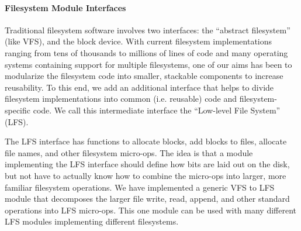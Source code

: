 \preparagraphspacing{}
\paragraph{Filesystem Module Interfaces}
\label{sec:interfaces}

Traditional filesystem software involves two interfaces: the ``abstract
filesystem'' (like VFS), and the block device. With current filesystem
implementations ranging from tens of thousands to millions of lines of code
and many operating systems containing support for multiple filesystems, one of
our aims has been to modularize the filesystem code into smaller, stackable
components to increase reusability. To this end, we add an additional
interface that helps to divide filesystem implementations into common (i.e.
reusable) code and filesystem-specific code. We call this intermediate
interface the ``Low-level File System'' (LFS).

The LFS interface has functions to allocate blocks, add blocks to files,
allocate file names, and other filesystem micro-ops. The idea is that a module
implementing the LFS interface should define how bits are laid out on the
disk, but not have to actually know how to combine the micro-ops into larger,
more familiar filesystem operations. We have implemented a generic VFS to LFS
module that decomposes the larger file write, read, append, and other standard
operations into LFS micro-ops. This one module can be used with many different
LFS modules implementing different filesystems.

